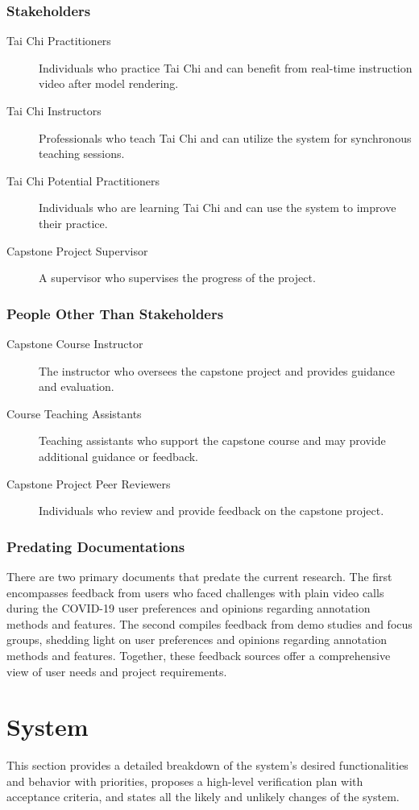 \documentclass[12pt]{article}
\begin{document}
\subsubsection{Stakeholders}
\begin{description}
    \item[Tai Chi Practitioners] Individuals who practice Tai Chi and can benefit from real-time instruction video after model rendering.
    \item[Tai Chi Instructors] Professionals who teach Tai Chi and can utilize the system for synchronous teaching sessions.
    \item[Tai Chi Potential Practitioners] Individuals who are learning Tai Chi and can use the system to improve their practice.
    \item[Capstone Project Supervisor] A supervisor who supervises the progress of the project.
\end{description}
\subsubsection{People Other Than Stakeholders}
\begin{description}
    \item[Capstone Course Instructor] The instructor who oversees the capstone project and provides guidance and evaluation.
    \item[Course Teaching Assistants] Teaching assistants who support the capstone course and may provide additional guidance or feedback.
    \item[Capstone Project Peer Reviewers] Individuals who review and provide feedback on the capstone project.
\end{description}

\subsubsection{Predating Documentations}
There are two primary documents that predate the current research. The first encompasses feedback from users who faced challenges with plain video calls during the COVID-19 user preferences and opinions regarding annotation methods and features. The second compiles feedback from demo studies and focus groups, shedding light on user preferences and opinions regarding annotation methods and features. Together, these feedback sources offer a comprehensive view of user needs and project requirements. 

\section{System}
This section provides a detailed breakdown of the system’s desired functionalities and behavior with priorities, proposes a high-level verification plan with acceptance criteria, and states all the likely and unlikely changes of the system.
\end{document}
